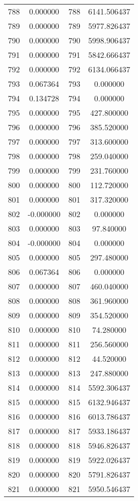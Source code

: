 \documentclass[12pt]{article}
\begin{document}
\begin{longtable}{@{}cccc@{}}
788 & 0.000000 & 788 & 6141.506437 \\
789 & 0.000000 & 789 & 5977.826437 \\
790 & 0.000000 & 790 & 5998.906437 \\
791 & 0.000000 & 791 & 5842.666437 \\
792 & 0.000000 & 792 & 6134.066437 \\
793 & 0.067364 & 793 & 0.000000 \\
794 & 0.134728 & 794 & 0.000000 \\
795 & 0.000000 & 795 & 427.800000 \\
796 & 0.000000 & 796 & 385.520000 \\
797 & 0.000000 & 797 & 313.600000 \\
798 & 0.000000 & 798 & 259.040000 \\
799 & 0.000000 & 799 & 231.760000 \\
800 & 0.000000 & 800 & 112.720000 \\
801 & 0.000000 & 801 & 317.320000 \\
802 & -0.000000 & 802 & 0.000000 \\
803 & 0.000000 & 803 & 97.840000 \\
804 & -0.000000 & 804 & 0.000000 \\
805 & 0.000000 & 805 & 297.480000 \\
806 & 0.067364 & 806 & 0.000000 \\
807 & 0.000000 & 807 & 460.040000 \\
808 & 0.000000 & 808 & 361.960000 \\
809 & 0.000000 & 809 & 354.520000 \\
810 & 0.000000 & 810 & 74.280000 \\
811 & 0.000000 & 811 & 256.560000 \\
812 & 0.000000 & 812 & 44.520000 \\
813 & 0.000000 & 813 & 247.880000 \\
814 & 0.000000 & 814 & 5592.306437 \\
815 & 0.000000 & 815 & 6132.946437 \\
816 & 0.000000 & 816 & 6013.786437 \\
817 & 0.000000 & 817 & 5933.186437 \\
818 & 0.000000 & 818 & 5946.826437 \\
819 & 0.000000 & 819 & 5922.026437 \\
820 & 0.000000 & 820 & 5791.826437 \\
821 & 0.000000 & 821 & 5950.546437 \\

\end{longtable}
\end{document}

